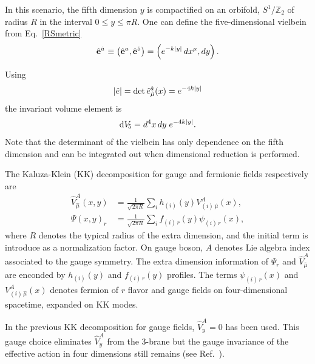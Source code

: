 In this scenario, the fifth dimension $y$ is compactified on an orbifold, $S^1/\mathbb{Z}_2$ of radius $R$ in the interval $0\leq y\leq \pi R$. One can define the five-dimensional vielbein from Eq.~\eqref{RSmetric} 
\begin{align}
  \vifhn{a}{} \equiv \left(\vifh^{a},\vifh^5\right) = \left(e^{-k|y|}\,dx^\mu,dy\right). 
\end{align}

Using
\begin{align}
|\hat{e}| = \det{\vih^{\hat{a}}_{\hat{\mu}}(x)} = e^{-4k|y|} 
\end{align}
the invariant volume element is %
\begin{align}
   \dv[5]  = d^4x\, dy\;e^{-4k|y|}.
\end{align}
Note that the determinant of the vielbein has only dependence on the fifth dimension and can be integrated out when dimensional reduction is performed. 

The Kaluza-Klein (KK) decomposition for gauge and fermionic fields respectively are
\begin{align}
  \label{KKgaugedecomp}
  \hat{V}_{\hat{\mu}}^A(x,y) &= \frac{1}{\sqrt{2\pi R}}\sum_{i}h_{(i)}(y)V_{(i)\,\hat{\mu}}^{A}(x), \\
  \label{KKspindecomp}
  \Psi(x,y)_r &= \frac{1}{\sqrt{2\pi R}}\sum_{i}f_{(i)\,r}(y)\psi_{(i)\,r}(x),
\end{align}
where $R$ denotes the typical radius of the extra dimension, and the initial term is introduce as a normalization factor. On gauge boson, $A$ denotes Lie algebra index associated to the gauge symmetry. The extra dimension information of $\Psi_r$ and $\hat{V}_{\hat{\mu}}^A$ are enconded by $h_{(i)}(y)$ and $f_{(i)\,r}(y)$ profiles. The terms $\psi_{(i)\,r}(x)$ and $V_{(i)\,\hat{\mu}}^{A}(x)$ denotes fermion of $r$ flavor and gauge fields on four-dimensional spacetime, expanded on KK modes. 

In the previous KK decomposition for gauge fields, $\hat{V}_y^A=0$ has been used. This gauge choice eliminates $\hat{V}_y^A$ from the 3-brane but the gauge invariance of the effective action in four dimensions still remains (see Ref.~\cite{Davoudiasl:1999tf}). 

